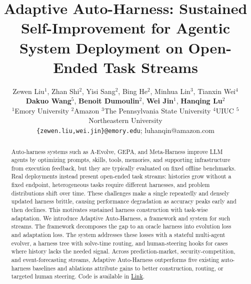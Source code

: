 \documentclass[11pt]{article}
\title{Adaptive Auto-Harness: Sustained Self-Improvement for Agentic System Deployment on Open-Ended Task Streams}
\author{Zewen Liu$^{1}$, Zhan Shi$^{2}$, Yisi Sang$^{2}$, Bing He$^{2}$, Minhua Lin$^{3}$, Tianxin Wei$^{4}$\\
\textbf{Dakuo Wang}$^{5}$, \textbf{Benoit Dumoulin}$^{2}$, \textbf{Wei Jin}$^{1}$, \textbf{Hanqing Lu}$^{2}$\\
$^{1}$Emory University $^{2}$Amazon $^{3}$The Pennsylvania State University $^{4}$UIUC $^{5}$Northeastern University \\
\texttt{\{zewen.liu,wei.jin\}@emory.edu}; 
{luhanqin@amazon.com}
}
\theoremstyle{plain}
\begin{document}
\maketitle

\begin{abstract}
Auto-harness systems such as A-Evolve, GEPA, and Meta-Harness improve LLM agents by optimizing prompts, skills, tools, memories, and supporting infrastructure from execution feedback, but they are typically evaluated on fixed offline benchmarks. Real deployments instead present open-ended task streams: histories grow without a fixed endpoint, heterogeneous tasks require different harnesses, and problem distributions shift over time. These challenges make a single repeatedly and densely updated harness brittle, causing performance degradation as accuracy peaks early and then declines. This motivates sustained harness construction with task-wise adaptation. We introduce Adaptive Auto-Harness, a framework and system for such streams. The framework decomposes the gap to an oracle harness into evolution loss and adaptation loss. The system addresses these losses with a stateful multi-agent evolver, a harness tree with solve-time routing, and human-steering hooks for cases where history lacks the needed signal. Across prediction-market, security-competition, and event-forecasting streams, Adaptive Auto-Harness outperforms five existing auto-harness baselines and ablations attribute gains to better construction, routing, or targeted human steering. Code is available in \href{https://github.com/A-EVO-Lab/a-evolve/tree/release/adaptive-auto-harness}{Link}.
\end{abstract}












\appendix

\end{document}
